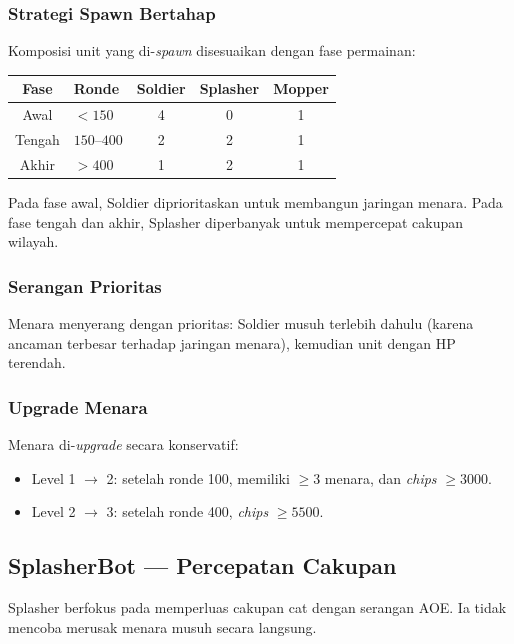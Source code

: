 \documentclass[12pt, a4paper]{article}
\begin{document}
\subsubsection*{Strategi Spawn Bertahap}

Komposisi unit yang di-\textit{spawn} disesuaikan dengan fase permainan:

\begin{center}
\begin{tabular}{clccc}
\toprule
\textbf{Fase} & \textbf{Ronde} & \textbf{Soldier} & \textbf{Splasher} & \textbf{Mopper} \\
\midrule
Awal   & $< 150$    & 4 & 0 & 1 \\
Tengah & $150$--$400$ & 2 & 2 & 1 \\
Akhir  & $> 400$    & 1 & 2 & 1 \\
\bottomrule
\end{tabular}
\end{center}

Pada fase awal, Soldier diprioritaskan untuk membangun jaringan menara. Pada fase
tengah dan akhir, Splasher diperbanyak untuk mempercepat cakupan wilayah.

\subsubsection*{Serangan Prioritas}

Menara menyerang dengan prioritas: Soldier musuh terlebih dahulu (karena ancaman
terbesar terhadap jaringan menara), kemudian unit dengan HP terendah.

\subsubsection*{Upgrade Menara}

Menara di-\textit{upgrade} secara konservatif:
\begin{itemize}
    \item Level 1 $\to$ 2: setelah ronde 100, memiliki $\geq 3$ menara, dan
          \textit{chips} $\geq 3000$.
    \item Level 2 $\to$ 3: setelah ronde 400, \textit{chips} $\geq 5500$.
\end{itemize}

\subsection{SplasherBot --- Percepatan Cakupan}

Splasher berfokus pada memperluas cakupan cat dengan serangan AOE. Ia tidak
mencoba merusak menara musuh secara langsung.
\end{document}
